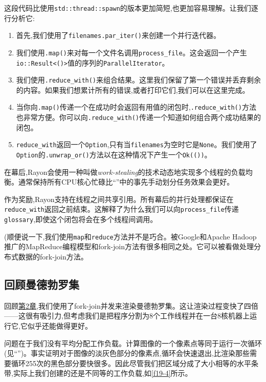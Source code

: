 这段代码比使用\texttt{std::thread::spawn}的版本更加简短,也更加容易理解。让我们逐行分析它:
\begin{enumerate}
    \item 首先,我们使用了\texttt{filenames.par\_iter()}来创建一个并行迭代器。
    \item 我们使用\texttt{.map()}来对每一个文件名调用\texttt{process\_file}。这会返回一个产生\texttt{io::Result<()>}值的序列的\texttt{ParallelIterator}。
    \item 我们使用\texttt{.reduce\_with()}来组合结果。这里我们保留了第一个错误并丢弃剩余的内容。如果我们想累计所有的错误,或者打印它们,我们可以在这里完成。
    \item 当你向\texttt{.map()}传递一个在成功时会返回有用值的闭包时,\texttt{.reduce\_with()}方法也非常方便。你可以向\texttt{.reduce\_with()}传递一个知道如何组合两个成功结果的闭包。
    \item \texttt{reduce\_with}返回一个\texttt{Option},只有当\texttt{filenames}为空时它是\texttt{None}。我们使用了\texttt{Option}的\texttt{.unwrap\_or()}方法以在这种情况下产生一个\texttt{Ok(())}。
\end{enumerate}

在幕后,Rayon会使用一种叫做\emph{work-stealing}的技术动态地实现多个线程的负载均衡。通常保持所有CPU核心忙碌比“”中的事先手动划分任务效果会更好。

作为奖励,Rayon支持在线程之间共享引用。所有幕后的并行处理都保证在\texttt{reduce\_with}返回之前结束。这解释了为什么我们可以向\texttt{process\_file}传递\texttt{glossary},即使这个闭包将会在多个线程间调用。

(顺便说一下,我们使用\texttt{map}和\texttt{reduce}方法并不是巧合。被Google和Apache Hadoop推广的MapReduce编程模型和fork-join方法有很多相同之处。它可以被看做处理分布式数据的fork-join方法。

\subsection{回顾曼德勃罗集}
回顾\hyperref[ch02]{第2章},我们使用了fork-join并发来渲染曼德勃罗集。这让渲染过程变快了四倍——这很有吸引力,但考虑我们是把程序分割为8个工作线程并在一台8核机器上运行它,它似乎还能做得更好。

问题在于我们没有平均分配工作负载。计算图像的一个像素点等同于运行一次循环(见“”)。事实证明对于图像的淡灰色部分的像素点,循环会快速退出,比渲染那些需要循环255次的黑色部分要快很多。因此尽管我们把区域分成了大小相等的水平条带,实际上我们创建的还是不同等的工作负载,如\autoref{f19-4}所示。

